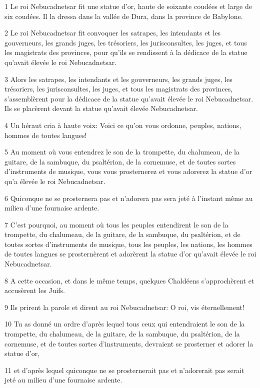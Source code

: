 \par 1 Le roi Nebucadnetsar fit une statue d'or, haute de soixante coudées et large de six coudées. Il la dressa dans la vallée de Dura, dans la province de Babylone.
\par 2 Le roi Nebucadnetsar fit convoquer les satrapes, les intendants et les gouverneurs, les grands juges, les trésoriers, les jurisconsultes, les juges, et tous les magistrats des provinces, pour qu'ils se rendissent à la dédicace de la statue qu'avait élevée le roi Nebucadnetsar.
\par 3 Alors les satrapes, les intendants et les gouverneurs, les grands juges, les trésoriers, les jurisconsultes, les juges, et tous les magistrats des provinces, s'assemblèrent pour la dédicace de la statue qu'avait élevée le roi Nebucadnetsar. Ils se placèrent devant la statue qu'avait élevée Nebucadnetsar.
\par 4 Un héraut cria à haute voix: Voici ce qu'on vous ordonne, peuples, nations, hommes de toutes langues!
\par 5 Au moment où vous entendrez le son de la trompette, du chalumeau, de la guitare, de la sambuque, du psaltérion, de la cornemuse, et de toutes sortes d'instruments de musique, vous vous prosternerez et vous adorerez la statue d'or qu'a élevée le roi Nebucadnetsar.
\par 6 Quiconque ne se prosternera pas et n'adorera pas sera jeté à l'instant même au milieu d'une fournaise ardente.
\par 7 C'est pourquoi, au moment où tous les peuples entendirent le son de la trompette, du chalumeau, de la guitare, de la sambuque, du psaltérion, et de toutes sortes d'instruments de musique, tous les peuples, les nations, les hommes de toutes langues se prosternèrent et adorèrent la statue d'or qu'avait élevée le roi Nebucadnetsar.
\par 8 A cette occasion, et dans le même temps, quelques Chaldéens s'approchèrent et accusèrent les Juifs.
\par 9 Ils prirent la parole et dirent au roi Nebucadnetsar: O roi, vis éternellement!
\par 10 Tu as donné un ordre d'après lequel tous ceux qui entendraient le son de la trompette, du chalumeau, de la guitare, de la sambuque, du psaltérion, de la cornemuse, et de toutes sortes d'instruments, devraient se prosterner et adorer la statue d'or,
\par 11 et d'après lequel quiconque ne se prosternerait pas et n'adorerait pas serait jeté au milieu d'une fournaise ardente.
